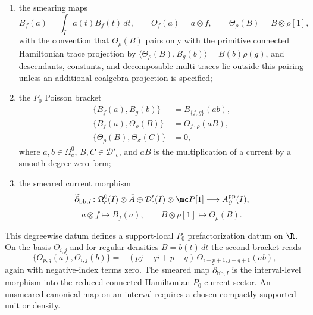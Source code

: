 \documentclass[11pt]{memoir}
\begin{document}
\begin{thm}
\begin{enumerate}
		      $I\mapsto\mathcal D'_c(I)$ given by extension by zero;
    \item the smearing maps
      $$B_f(a)=\int_I a(t)B_f(t)\,dt,\qquad
        O_f(a)=a\otimes f,\qquad
        \Theta_\rho(B)=B\otimes\rho[1],$$
      with the convention that $\Theta_\rho(B)$ pairs only with the
      primitive connected Hamiltonian trace projection by
      $\langle\Theta_\rho(B),B_g(b)\rangle=B(b)\rho(g)$, and
      descendants, constants, and decomposable multi-traces lie outside
      this pairing unless an additional coalgebra projection is
      specified;
    \item the $P_0$ Poisson bracket
      \begin{align*}
        \{B_f(a),B_g(b)\}&=B_{\{f,g\}}(ab),\\
        \{B_f(a),\Theta_\rho(B)\}&=\Theta_{f\cdot\rho}(aB),\\
        \{\Theta_\rho(B),\Theta_\sigma(C)\}&=0,
      \end{align*}
	      where $a,b\in\Omega^0_c$, $B,C\in\mathcal D'_c$, and $aB$ is the
	      multiplication of a current by a smooth degree-zero form;
	    \item the smeared current morphism
	      \[
	        \widetilde\partial_{\mathrm{bb},I}\colon
	        \Omega_c^0(I)\otimes\bar A
	        \oplus \mathcal D'_c(I)\otimes\mc P[1]
	        \longrightarrow A_{\partial}^{\mathrm{pp}}(I),
	      \]
	      \[
	        a\otimes f\longmapsto B_f(a),\qquad
	        B\otimes\rho[1]\longmapsto\Theta_\rho(B).
	      \]
	  \end{enumerate}
	  This degreewise datum defines a support-local \(P_0\) prefactorization datum on
	  $\R$. On the basis
  $\Theta_{i,j}$ and for regular densities $B=b(t)\,dt$ the second
  bracket reads
  $$\{O_{p,q}(a),\Theta_{i,j}(b)\}
    =-(pj-qi+p-q)\,\Theta_{i-p+1,j-q+1}(ab),$$
	  again with negative-index terms zero. The smeared map
	  \(\widetilde\partial_{\mathrm{bb},I}\) is the interval-level morphism into
	  the reduced connected Hamiltonian \(P_0\) current sector. An unsmeared
	  canonical map on an interval requires a chosen compactly supported unit or
	  density.
\end{thm}
\end{document}
